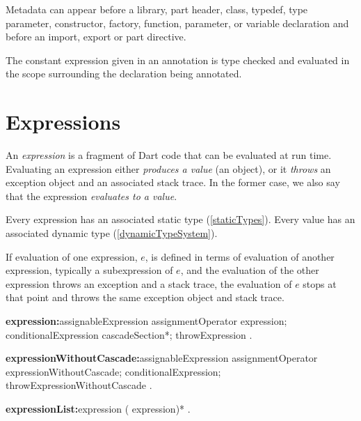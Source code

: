 \documentclass{article}
\begin{document}

\LMHash{}
Metadata can appear before a library, part header, class, typedef, type parameter, constructor, factory, function, parameter, or variable declaration and before an import, export or part directive.

\LMHash{}
The constant expression given in an annotation is type checked and evaluated in the scope surrounding the declaration being annotated.


\section{Expressions}

\LMHash{}
\label{evaluation}
An {\em expression} is a fragment of Dart code that can be evaluated at run time.
Evaluating an expression either {\em produces a value} (an object),
or it {\em throws} an exception object and an associated stack trace.
In the former case, we also say that the expression {\em evaluates to a value}.

\LMHash{}
Every expression has an associated static type (\ref{staticTypes}).
Every value has an associated dynamic type (\ref{dynamicTypeSystem}).

\LMHash{}
If evaluation of one expression, $e$, is defined in terms of evaluation of another expression, typically a subexpression of $e$,
and the evaluation of the other expression throws an exception and a stack trace,
the evaluation of $e$ stops at that point and throws the same exception object and stack trace.

\begin{grammar}
{\bf expression:}assignableExpression assignmentOperator expression;
  conditionalExpression cascadeSection*;
  throwExpression
  .

{\bf expressionWithoutCascade:}assignableExpression assignmentOperator
  \gnewline{} expressionWithoutCascade;
  conditionalExpression;
  throwExpressionWithoutCascade
  .

{\bf expressionList:}expression (\gcomma{} expression)*
  .
\end{grammar}
\end{document}
